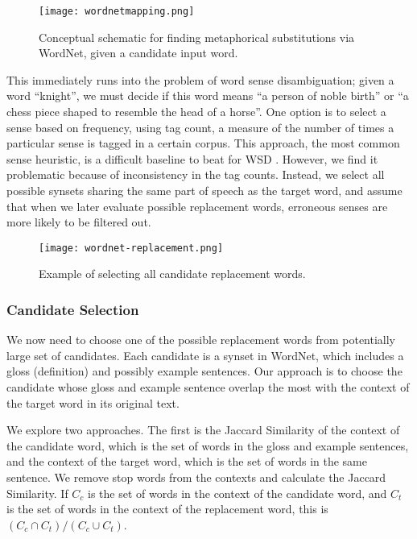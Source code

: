 \documentclass[12pt]{article}
\begin{document}
\begin{figure}[h]
	\centering
	\texttt{[image: wordnetmapping.png]}
	\caption{Conceptual schematic for finding metaphorical substitutions via WordNet, given a candidate input word.}
	\label{fig:wnmapping}
\end{figure}

This immediately runs into the problem of word sense disambiguation; given a word ``knight'', we must decide if this word means ``a person of noble birth'' or ``a chess piece shaped to resemble the head of a horse''. One option is to select a sense based on frequency, using tag count, a measure of the number of times a particular sense is tagged in a certain corpus. This approach, the most common sense heuristic, is a difficult baseline to beat for WSD \cite{mccarthy}. However, we find it problematic because of inconsistency in the tag counts. Instead, we select all possible synsets sharing the same part of speech as the target word, and assume that when we later evaluate possible replacement words, erroneous senses are more likely to be filtered out.

\begin{figure}[h]
	\centering
	\texttt{[image: wordnet-replacement.png]}
	\caption{Example of selecting all candidate replacement words.}
	\label{fig:wnmapexample}
\end{figure}

\subsubsection{Candidate Selection}

We now need to choose one of the possible replacement words from potentially large set of candidates. Each candidate is a synset in WordNet, which includes a gloss (definition) and possibly example sentences. Our approach is to choose the candidate whose gloss and example sentence overlap the most with the context of the target word in its original text.

We explore two approaches. The first is the Jaccard Similarity of the context of the candidate word, which is the set of words in the gloss and example sentences, and the context of the target word, which is the set of words in the same sentence. We remove stop words from the contexts and calculate the Jaccard Similarity. If $C_c$ is the set of words in the context of the candidate word, and $C_t$ is the set of words in the context of the replacement word, this is $(C_c \cap C_t) / (C_c \cup C_t)$.
\end{document}
